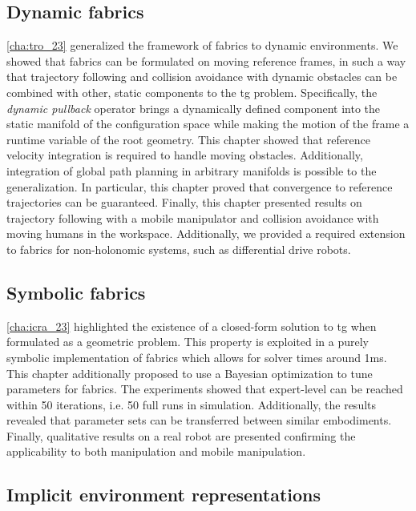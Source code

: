 \subsection{Dynamic fabrics}
\label{sec:conclusion_dynamic_fabrics}

\cref{cha:tro_23} generalized the framework of \ac{fabrics} to dynamic
environments. We showed that \ac{fabrics} can be formulated on moving reference
frames, in such a way that trajectory following and collision avoidance with
dynamic obstacles can be combined with other, static components to the \ac{tg}
problem. Specifically, the \textit{dynamic pullback}
operator brings a dynamically defined component into the static manifold of the
configuration space while making the motion of the frame a runtime variable of
the root geometry. This chapter showed that reference velocity integration is
required to handle moving obstacles. Additionally, integration of global path
planning in arbitrary manifolds is possible to the generalization. In
particular, this chapter proved that convergence to reference trajectories can be 
guaranteed. Finally, this chapter presented results on trajectory following with a
mobile manipulator and collision avoidance with moving humans in the workspace.
Additionally, we provided a required extension to
\ac{fabrics} for non\hyp{}holonomic systems, such as differential
drive robots.

\subsection{Symbolic fabrics}
\label{sec:conclusion_symbolic_fabrics}

\cref{cha:icra_23} highlighted the existence of a
closed-form solution to \ac{tg} when formulated as a geometric problem.
This property is exploited in a purely symbolic implementation of \ac{fabrics}
which allows for solver times around 1ms. This chapter additionally
proposed to use a Bayesian optimization to tune parameters
for \ac{fabrics}.
The experiments showed that expert-level can be reached within 50 iterations, 
i.e. 50 full runs in simulation.
Additionally, the results revealed that parameter sets can be transferred between
similar embodiments. Finally, qualitative results on a real robot are presented
confirming the applicability to both manipulation and mobile
manipulation.

\subsection{Implicit environment representations}
\label{sec:conclusion_implicit}


